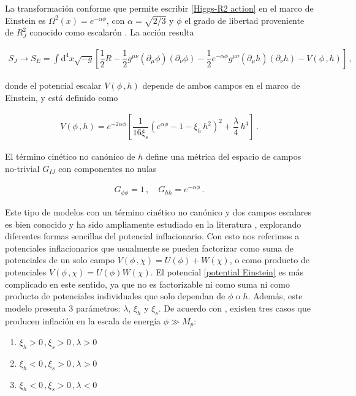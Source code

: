 \documentclass[12pt,a4paper,english,nofootinbib]{revtex4}
\newcommand{\dif}{\mathrm{d}}
\newcommand{\beq}{\begin{eqnarray}}
\newcommand{\enq}{\end{eqnarray}}
\begin{document}
La transformación conforme que permite escribir \eqref{Higgs-R2 action} en el marco de Einstein es $\Omega^2(x) =e^{-\alpha \phi}$, con $\alpha = \sqrt{2/3}$ y $\phi$ el grado de libertad proveniente de $R^2_J$ conocido como escalarón \cite{EMA2017}. La acción resulta 


\beq 
S_J \to S_E = \int \dif^4 x\sqrt{-g}\left[\dfrac{1}{2}R - \dfrac{1}{2}g^{\mu\nu}(\partial_\mu \phi)(\partial_\nu \phi) - \dfrac{1}{2}e^{-\alpha\phi}g^{\mu\nu}(\partial_\mu h)(\partial_\nu h) - V(\phi\,,h)\right ]\,,
    \label{accion marco einstein}
\enq 

donde el potencial escalar $V(\phi\,,h)$ depende de ambos campos en el marco de Einstein, y está definido como

\beq 
V(\phi\,,h) = e^{-2\alpha\phi}\left[\dfrac{1}{16\xi_s}\left(e^{\alpha\phi} - 1 - \xi_h\,h^2 \right)^2 + \dfrac{\lambda}{4}\,h^4\right]\,.
    \label{potential Einstein}
\enq

El término cinético no canónico de $h$ define  una métrica del espacio de campos no-trivial $G_{IJ}$ con componentes no nulas

\beq 
    G_{\phi\phi} = 1\,,\quad G_{hh} = e^{-\alpha\phi}\,.
    \label{field space metric}
\enq 

Este tipo de modelos con un término cinético no canónico y dos campos escalares es bien conocido y ha sido ampliamente estudiado en la literatura \cite{Lalak2007, STAROBINSKY2001, Dimarco2003,DiMarco2005, Tolley_2010, Cremonini2011}, explorando diferentes formas sencillas del potencial inflacionario. Con esto nos referimos a potenciales inflacionarios que usualmente se pueden factorizar como suma de potenciales de un solo campo $V(\phi\,,\chi) = U(\phi) + W(\chi)$, o como producto de potenciales $V(\phi\,,\chi) = U(\phi)W(\chi)$. El potencial \eqref{potential Einstein} es más complicado en este sentido, ya que no es factorizable ni como suma ni como producto de potenciales individuales que solo dependan de $\phi$ o $h$.
Además, este modelo presenta 3 parámetros: $\lambda$, $\xi_h$ y $\xi_s$. De acuerdo con \cite{EMA2017}, existen tres casos que producen inflación en la escala de energía $\phi \gg M_p$:

\begin{enumerate}
    \item $\xi_h >0\,,\xi_s >0\,, \lambda >0$
    \item $\xi_h <0\,, \xi_s > 0\,, \lambda >0$
    \item $\xi_h <0\,, \xi_s > 0\,, \lambda < 0$
\end{enumerate}
\end{document}
